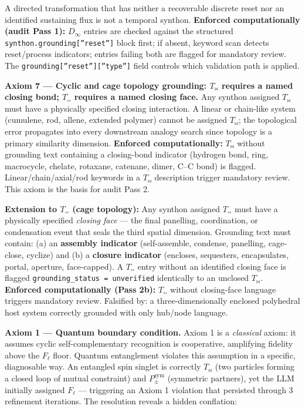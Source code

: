 \documentclass[12pt,a4paper]{article}
\begin{document}
A directed transformation that has neither a recoverable discrete reset nor an identified sustaining flux is not a temporal synthon. \textbf{Enforced computationally (audit Pass 1):} $D_{\infty}$ entries are checked against the structured \texttt{synthon.grounding{[}''reset''{]}} block first; if absent, keyword scan detects reset/process indicators; entries failing both are flagged for mandatory review. The \texttt{grounding{[}''reset''{]}{[}''type''{]}} field controls which validation path is applied.

\textbf{Axiom 7 --- Cyclic and cage topology grounding: $T_{\bowtie}$ requires a named closing bond; $T_{\square\square}$ requires a named closing face.}
Any synthon assigned $T_{\bowtie}$ must have a physically specified closing interaction. A linear or chain-like system (cumulene, rod, allene, extended polymer) cannot be assigned $T_{\bowtie}$; the topological error propagates into every downstream analogy search since topology is a primary similarity dimension. \textbf{Enforced computationally:} $T_{\bowtie}$ without grounding text containing a closing-bond indicator (hydrogen bond, ring, macrocycle, chelate, rotaxane, catenane, dimer, C--C bond) is flagged. Linear/chain/axial/rod keywords in a $T_{\bowtie}$ description trigger mandatory review. This axiom is the basis for audit Pass 2.

\textbf{Extension to $T_{\square\square}$ (cage topology):} Any synthon assigned $T_{\square\square}$ must have a physically specified \emph{closing face} --- the final panelling, coordination, or condensation event that seals the third spatial dimension. Grounding text must contain: (a) an \textbf{assembly indicator} (self-assemble, condense, panelling, cage-close, cyclize) and (b) a \textbf{closure indicator} (encloses, sequesters, encapsulates, portal, aperture, face-capped). A $T_{\square\square}$ entry without an identified closing face is flagged \texttt{grounding\_status = unverified} identically to an unclosed $T_{\bowtie}$. \textbf{Enforced computationally (Pass 2b):} $T_{\square\square}$ without closing-face language triggers mandatory review. Falsified by: a three-dimensionally enclosed polyhedral host system correctly grounded with only hub/node language.

\textbf{Axiom 1 --- Quantum boundary condition.} Axiom 1 is a \emph{classical} axiom: it assumes cyclic self-complementary recognition is cooperative, amplifying fidelity above the $F_{\ell}$ floor. Quantum entanglement violates this assumption in a specific, diagnosable way. An entangled spin singlet is correctly $T_{\bowtie}$ (two particles forming a closed loop of mutual constraint) and $P_{\pm}^{\text{sym}}$ (symmetric partners), yet the LLM initially assigned $F_{\ell}$ --- triggering an Axiom 1 violation that persisted through 3 refinement iterations. The resolution reveals a hidden conflation:
\end{document}
